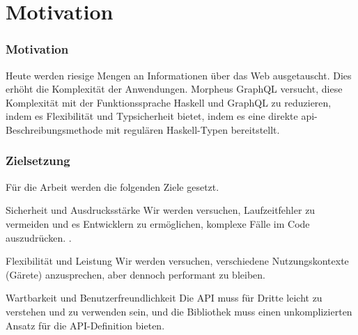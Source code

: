 
\section{Motivation}

\begin{frame}{}
    \frametitle{Motivation}

    Heute werden riesige Mengen an Informationen über das Web ausgetauscht. Dies erhöht die Komplexität der Anwendungen. Morpheus GraphQL versucht, diese Komplexität mit der Funktionssprache Haskell und GraphQL zu reduzieren, indem es Flexibilität und Typsicherheit bietet, indem es eine direkte api-Beschreibungsmethode mit regulären Haskell-Typen bereitstellt. 

\end{frame}

\begin{frame}
    \frametitle{Zielsetzung}

    Für die Arbeit werden die folgenden Ziele gesetzt.    



        \footnotesize

        \begin{block}{Sicherheit und Ausdrucksstärke}
            Wir werden versuchen, Laufzeitfehler zu vermeiden und es Entwicklern zu ermöglichen, komplexe Fälle im Code auszudrücken.
            \cite{history-of-haskell}.
        \end{block}

        \begin{block}{Flexibilität und Leistung} 
            Wir werden  versuchen, verschiedene Nutzungskontexte (Gärete) anzusprechen, aber dennoch performant zu bleiben. 
        \end{block}

        \begin{block}{Wartbarkeit und Benutzerfreundlichkeit} 
            Die API muss für Dritte leicht zu verstehen und zu verwenden sein, und die Bibliothek muss einen unkomplizierten Ansatz für die API-Definition bieten. 
        \end{block}
\end{frame}

